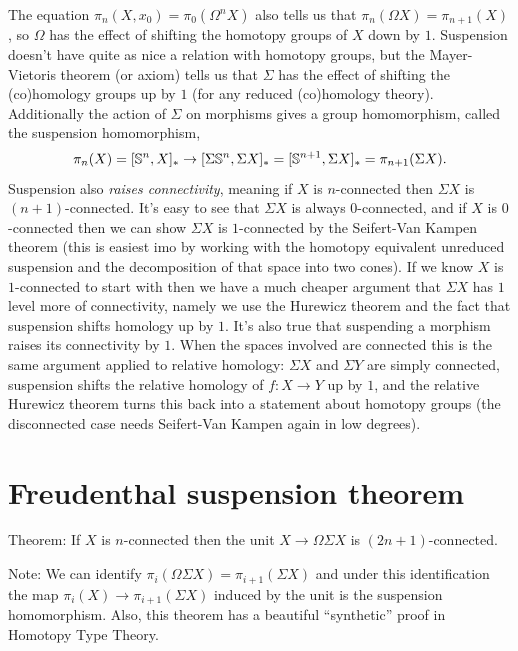 The equation \(\pi_n(X, x_0) = \pi_0(\Omega^n X)\) also tells us that \(\pi_n(\Omega X) = \pi_{n+1}(X)\), so \(\Omega\) has the effect of shifting the homotopy groups of \(X\) down by \(1\). Suspension doesn't have quite as nice a relation with homotopy groups, but the Mayer-Vietoris theorem (or axiom) tells us that \(\Sigma\) has the effect of shifting the (co)homology groups up by \(1\) (for any reduced (co)homology theory). Additionally the action of \(\Sigma\) on morphisms gives a group homomorphism, called the suspension homomorphism, \[\pi_n(X) = [\S^n, X]_* \to [\Sigma \S^n, \Sigma X]_* = [\S^{n+1}, \Sigma X]_* = \pi_{n+1}(\Sigma X).\]Suspension also \emph{raises connectivity}, meaning if \(X\) is \(n\)-connected then \(\Sigma X\) is \((n+1)\)-connected. It's easy to see that \(\Sigma X\) is always \(0\)-connected, and if \(X\) is \(0\)-connected then we can show \(\Sigma X\) is \(1\)-connected by the Seifert-Van Kampen theorem (this is easiest imo by working with the homotopy equivalent unreduced suspension and the decomposition of that space into two cones). If we know \(X\) is \(1\)-connected to start with then we have a much cheaper argument that \(\Sigma X\) has \(1\) level more of connectivity, namely we use the Hurewicz theorem and the fact that suspension shifts homology up by \(1\). It's also true that suspending a morphism raises its connectivity by \(1\). When the spaces involved are connected this is the same argument applied to relative homology: \(\Sigma X\) and \(\Sigma Y\) are simply connected, suspension shifts the relative homology of \(f : X \to Y\) up by \(1\), and the relative Hurewicz theorem turns this back into a statement about homotopy groups (the disconnected case needs Seifert-Van Kampen again in low degrees).

\section{Freudenthal suspension theorem}

Theorem: If \(X\) is \(n\)-connected then the unit \(X \to \Omega \Sigma X\) is \((2n+1)\)-connected.

Note: We can identify \(\pi_i(\Omega \Sigma X) = \pi_{i + 1}(\Sigma X)\) and under this identification the map \(\pi_i(X) \to \pi_{i+1}(\Sigma X)\) induced by the unit is the suspension homomorphism. Also, this theorem has a beautiful ``synthetic'' proof in Homotopy Type Theory.

